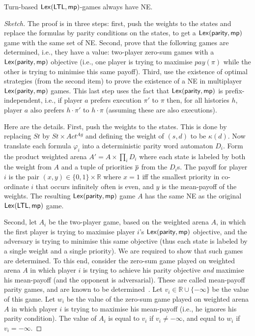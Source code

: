 \begin{theorem} \label{thm:TB}
 Turn-based ${\sf Lex}(\mathsf{LTL},{\sf mp})$-games always have NE.
\end{theorem}
\begin{proof}[Sketch]
The proof is in three steps: first, push the weights to the states and replace the \LTL formulas by parity conditions on the states, to get a 
${\sf Lex}({\sf parity},{\sf mp})$ game with the same set of NE. Second, 
prove that the following games are determined, i.e., they have a value: two-player zero-sum games with a ${\sf Lex}({\sf parity},{\sf mp})$ objective 
(i.e., one player is trying to maximise $pay(\pi)$ while the other is trying to minimise this same payoff). Third, use the existence of optimal strategies (from the second item) to prove the existence of a NE in multiplayer ${\sf Lex}({\sf parity},{\sf mp})$ games. This last step uses the fact that ${\sf Lex}({\sf parity},{\sf mp})$ is prefix-independent, i.e., if player $a$ prefers execution $\pi'$ to $\pi$ then, for all histories $h$, player $a$ also prefers $h \cdot \pi'$ to $h \cdot \pi$ (assuming these are also executions). 

Here are the details. First, push the weights to the states. This is done by replacing $St$ by $St \times Act^{Ag}$ and defining the weight of $(s,d)$ to be $\kappa(d)$. Now translate each \LTL formula $\varphi_i$ into a deterministic parity word automaton  $D_i$. Form the product weighted arena $A' = A \times \prod_i D_i$ where each state is labeled by both the weight from $A$ and a tuple of priorities $\overline{p}$ from the $D_i$s. The payoff for player $i$ is the pair $(x,y) \in \{0,1\} \times \mathbb{R}$ where $x = 1$ iff the smallest priority in co-ordinate $i$ that occurs infinitely often is even, and $y$ is the mean-payoff of the weights. The resulting ${\sf Lex}({\sf parity},{\sf mp})$ game $A$ has the same NE as the original ${\sf Lex}(\mathsf{LTL},{\sf mp})$ game.


Second, let $A_i$ be the two-player game, based on the weighted arena $A$, in which the first player is trying to maximise player $i$'s ${\sf Lex}({\sf parity},{\sf mp})$ objective, and the adversary is trying to minimise this same objective (thus each state is labeled by a single weight and a single priority). We are required to show that such games are determined. To this end, consider the zero-sum game played on weighted arena $A$ in which player $i$ is trying to achieve his parity objective \emph{and} maximise his mean-payoff (and the opponent is adversarial). These are called mean-payoff parity games, and are known to be determined~\cite{DBLP:conf/lics/ChatterjeeHJ05}. Let $v_i \in \mathbb{R} \cup \{-\infty\}$ be the value of this game. Let $w_i$ be the value of the zero-sum game played on weighted arena $A$ in which player $i$ is trying to maximise his mean-payoff (i.e., he ignores his parity condition). The value of $A_i$ is equal to $v_i$ if $v_i \neq -\infty$, and equal to $w_i$ if $v_i = -\infty$.


\end{proof}
